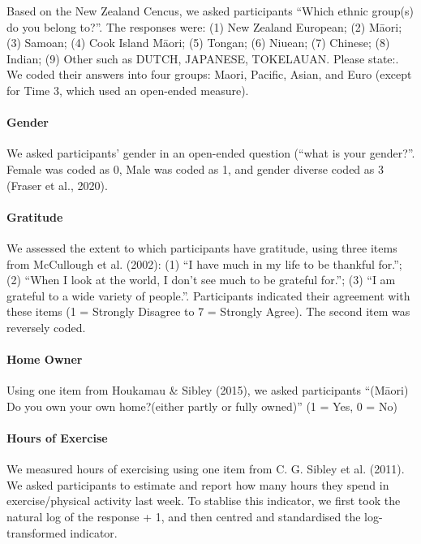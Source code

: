 \documentclass[
  letterpaper,
  DIV=11,
  numbers=noendperiod]{scrartcl}
\let\oldparagraph\paragraph
\renewcommand{\paragraph}[1]{\oldparagraph{#1}\mbox{}}
\begin{document}
Based on the New Zealand Cencus, we asked participants ``Which ethnic
group(s) do you belong to?''. The responses were: (1) New Zealand
European; (2) Māori; (3) Samoan; (4) Cook Island Māori; (5) Tongan; (6)
Niuean; (7) Chinese; (8) Indian; (9) Other such as DUTCH, JAPANESE,
TOKELAUAN. Please state:. We coded their answers into four groups:
Maori, Pacific, Asian, and Euro (except for Time 3, which used an
open-ended measure).

\hypertarget{gender}{%
\paragraph{Gender}\label{gender}}

We asked participants' gender in an open-ended question (``what is your
gender?''. Female was coded as 0, Male was coded as 1, and gender
diverse coded as 3 (Fraser et al., 2020).

\hypertarget{gratitude}{%
\paragraph{Gratitude}\label{gratitude}}

We assessed the extent to which participants have gratitude, using three
items from McCullough et al. (2002): (1) ``I have much in my life to be
thankful for.''; (2) ``When I look at the world, I don't see much to be
grateful for.''; (3) ``I am grateful to a wide variety of people.''.
Participants indicated their agreement with these items (1 = Strongly
Disagree to 7 = Strongly Agree). The second item was reversely coded.

\hypertarget{home-owner}{%
\paragraph{Home Owner}\label{home-owner}}

Using one item from Houkamau \& Sibley (2015), we asked participants
``(Māori) Do you own your own home?(either partly or fully owned)'' (1 =
Yes, 0 = No)

\hypertarget{hours-of-exercise}{%
\paragraph{Hours of Exercise}\label{hours-of-exercise}}

We measured hours of exercising using one item from C. G. Sibley et al.
(2011). We asked participants to estimate and report how many hours they
spend in exercise/physical activity last week. To stablise this
indicator, we first took the natural log of the response + 1, and then
centred and standardised the log-transformed indicator.
\end{document}
